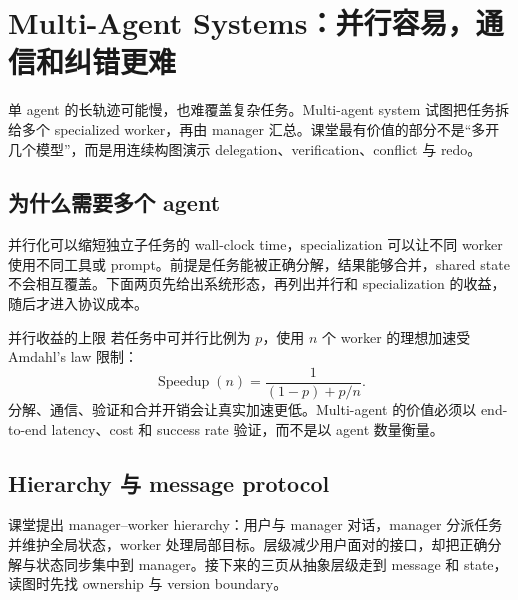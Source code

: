 \section{Multi-Agent Systems：并行容易，通信和纠错更难}

单 agent 的长轨迹可能慢，也难覆盖复杂任务。Multi-agent system 试图把任务拆给多个 specialized worker，再由 manager 汇总。课堂最有价值的部分不是“多开几个模型”，而是用连续构图演示 delegation、verification、conflict 与 redo。

\subsection{为什么需要多个 agent}

并行化可以缩短独立子任务的 wall-clock time，specialization 可以让不同 worker 使用不同工具或 prompt。前提是任务能被正确分解，结果能够合并，shared state 不会相互覆盖。下面两页先给出系统形态，再列出并行和 specialization 的收益，随后才进入协议成本。



\begin{importantbox}{并行收益的上限}
若任务中可并行比例为 $p$，使用 $n$ 个 worker 的理想加速受 Amdahl's law 限制：
\[
\operatorname{Speedup}(n)=\frac{1}{(1-p)+p/n}.
\]
分解、通信、验证和合并开销会让真实加速更低。Multi-agent 的价值必须以 end-to-end latency、cost 和 success rate 验证，而不是以 agent 数量衡量。
\end{importantbox}


\subsection{Hierarchy 与 message protocol}

课堂提出 manager--worker hierarchy：用户与 manager 对话，manager 分派任务并维护全局状态，worker 处理局部目标。层级减少用户面对的接口，却把正确分解与状态同步集中到 manager。接下来的三页从抽象层级走到 message 和 state，读图时先找 ownership 与 version boundary。


